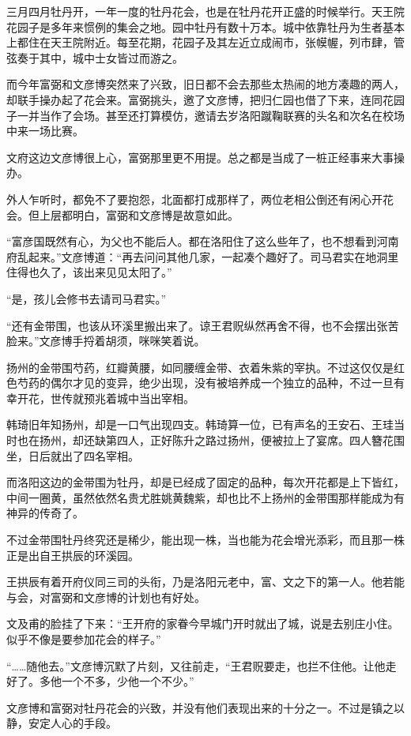 三月四月牡丹开，一年一度的牡丹花会，也是在牡丹花开正盛的时候举行。天王院花园子是多年来惯例的集会之地。园中牡丹有数十万本。城中依靠牡丹为生者基本上都住在天王院附近。每至花期，花园子及其左近立成闹市，张幙幄，列市肆，管弦奏于其中，城中士女皆过而游之。

而今年富弼和文彦博突然来了兴致，旧日都不会去那些太热闹的地方凑趣的两人，却联手操办起了花会来。富弼挑头，邀了文彦博，把归仁园也借了下来，连同花园子一并当作了会场。甚至还打算模仿，邀请去岁洛阳蹴鞠联赛的头名和次名在校场中来一场比赛。

文府这边文彦博很上心，富弼那里更不用提。总之都是当成了一桩正经事来大事操办。

外人乍听时，都免不了要抱怨，北面都打成那样了，两位老相公倒还有闲心开花会。但上层都明白，富弼和文彦博是故意如此。

“富彦国既然有心，为父也不能后人。都在洛阳住了这么些年了，也不想看到河南府乱起来。”文彦博道：“再去问问其他几家，一起凑个趣好了。司马君实在地洞里住得也久了，该出来见见太阳了。”

“是，孩儿会修书去请司马君实。”

“还有金带围，也该从环溪里搬出来了。谅王君贶纵然再舍不得，也不会摆出张苦脸来。”文彦博手捋着胡须，咪咪笑着说。

扬州的金带围芍药，红瓣黄腰，如同腰缠金带、衣着朱紫的宰执。不过这仅仅是红色芍药的偶尔才见的变异，绝少出现，没有被培养成一个独立的品种，不过一旦有幸开花，世传就预兆着城中当出宰相。

韩琦旧年知扬州，却是一口气出现四支。韩琦算一位，已有声名的王安石、王珪当时也在扬州，却还缺第四人，正好陈升之路过扬州，便被拉上了宴席。四人簪花围坐，日后就出了四名宰相。

而洛阳这边的金带围为牡丹，却是已经成了固定的品种，每次开花都是上下皆红，中间一圈黄，虽然依然名贵尤胜姚黄魏紫，却也比不上扬州的金带围那样能成为有神异的传奇了。

不过金带围牡丹终究还是稀少，能出现一株，当也能为花会增光添彩，而且那一株正是出自王拱辰的环溪园。

王拱辰有着开府仪同三司的头衔，乃是洛阳元老中，富、文之下的第一人。他若能与会，对富弼和文彦博的计划也有好处。

文及甫的脸挂了下来：“王开府的家眷今早城门开时就出了城，说是去别庄小住。似乎不像是要参加花会的样子。”

“……随他去。”文彦博沉默了片刻，又往前走，“王君贶要走，也拦不住他。让他走好了。多他一个不多，少他一个不少。”

文彦博和富弼对牡丹花会的兴致，并没有他们表现出来的十分之一。不过是镇之以静，安定人心的手段。

